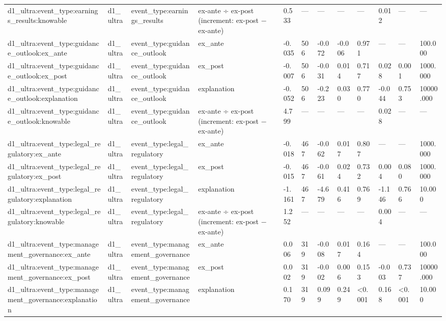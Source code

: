 \begin{tabular}{llllllllllll}
d1\_ultra:event\_type:earnings\_results:knowable & d1\_ultra & event\_type:earnings\_results & ex-ante ÷ ex-post (increment: ex-post − ex-ante) & 0.533 & — & — & — & — & 0.012 & — & — \\
d1\_ultra:event\_type:guidance\_outlook:ex\_ante & d1\_ultra & event\_type:guidance\_outlook & ex\_ante & -0.035 & 506 & -0.072 & -0.006 & 0.971 & — & — & 100.000 \\
d1\_ultra:event\_type:guidance\_outlook:ex\_post & d1\_ultra & event\_type:guidance\_outlook & ex\_post & -0.007 & 506 & -0.031 & 0.014 & 0.717 & 0.028 & 0.001 & 1000.000 \\
d1\_ultra:event\_type:guidance\_outlook:explanation & d1\_ultra & event\_type:guidance\_outlook & explanation & -0.052 & 506 & -0.223 & 0.030 & 0.770 & -0.044 & 0.753 & 10000.000 \\
d1\_ultra:event\_type:guidance\_outlook:knowable & d1\_ultra & event\_type:guidance\_outlook & ex-ante ÷ ex-post (increment: ex-post − ex-ante) & 4.799 & — & — & — & — & 0.028 & — & — \\
d1\_ultra:event\_type:legal\_regulatory:ex\_ante & d1\_ultra & event\_type:legal\_regulatory & ex\_ante & -0.018 & 467 & -0.062 & 0.017 & 0.807 & — & — & 1000.000 \\
d1\_ultra:event\_type:legal\_regulatory:ex\_post & d1\_ultra & event\_type:legal\_regulatory & ex\_post & -0.015 & 467 & -0.061 & 0.024 & 0.732 & 0.004 & 0.080 & 1000.000 \\
d1\_ultra:event\_type:legal\_regulatory:explanation & d1\_ultra & event\_type:legal\_regulatory & explanation & -1.161 & 467 & -4.679 & 0.416 & 0.769 & -1.146 & 0.766 & 10.000 \\
d1\_ultra:event\_type:legal\_regulatory:knowable & d1\_ultra & event\_type:legal\_regulatory & ex-ante ÷ ex-post (increment: ex-post − ex-ante) & 1.252 & — & — & — & — & 0.004 & — & — \\
d1\_ultra:event\_type:management\_governance:ex\_ante & d1\_ultra & event\_type:management\_governance & ex\_ante & 0.006 & 319 & -0.008 & 0.017 & 0.164 & — & — & 100.000 \\
d1\_ultra:event\_type:management\_governance:ex\_post & d1\_ultra & event\_type:management\_governance & ex\_post & 0.002 & 319 & -0.002 & 0.006 & 0.153 & -0.003 & 0.737 & 10000.000 \\
d1\_ultra:event\_type:management\_governance:explanation & d1\_ultra & event\_type:management\_governance & explanation & 0.170 & 319 & 0.099 & 0.249 & <0.001 & 0.168 & <0.001 & 10.000 \\

\end{tabular}
